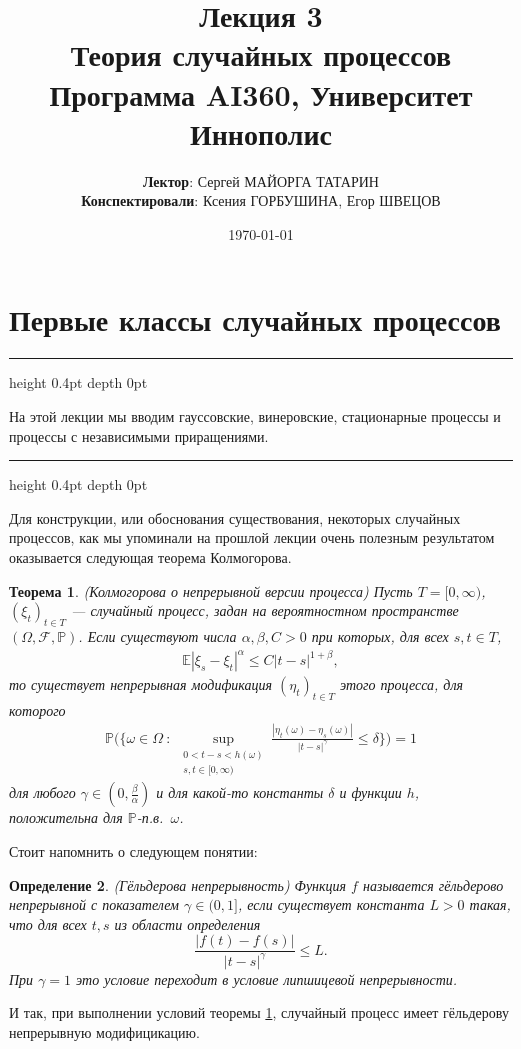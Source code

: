 \documentclass[10pt]{article}
\author{\textbf{Лектор}: Сергей МАЙОРГА ТАТАРИН \\ \textbf{Конспектировали}: Ксения ГОРБУШИНА, Егор ШВЕЦОВ}
\date{\today}
\title{Лекция 3 \\ Теория случайных процессов \\ Программа AI360, Университет Иннополис}
\newtheorem{thm}{Теорема}[section]
\newtheorem{defn}[thm]{Определение}
\theoremstyle{boldnormal}
\newcommand{\PP}{{\ensuremath{\mathbb{P}}}}
\newcommand{\EE}{{\ensuremath{\mathbb{E}}}}
\theoremstyle{boldremark}
\newenvironment{sectionabstract}{%
  \par\vspace{3pt}%
  \hrule height 0.4pt depth 0pt \relax
  \vspace{3pt}%
  \itshape\small
  \list{}{%
    \leftmargin=2em
    \rightmargin=2em
    \topsep=0pt
    \parsep=0pt
  }%
  \item\relax
}{%
  \endlist
  \par\vspace{3pt}%
  \hrule height 0.4pt depth 0pt \relax
  \vspace{3pt}%
}
\begin{document}
\maketitle

\section{Первые классы случайных процессов}
\begin{sectionabstract}
    На этой лекции мы вводим 
гауссовские, винеровские, стационарные процессы и процессы 
с независимыми приращениями.
\end{sectionabstract}

Для конструкции, или обоснования существования,
некоторых случайных процессов, как мы упоминали на прошлой 
лекции очень полезным результатом оказывается следующая 
теорема Колмогорова.
\begin{thm}\label{thm:kolmogorovcontver} (Колмогорова о непрерывной 
  версии процесса)
Пусть \(T=[0,\infty)\), \((\xi_t)_{t\in T}\) --- случайный процесс,
задан на вероятностном пространстве \((\Omega,\mathscr{F},\PP)\). Если
существуют числа \(\alpha,\beta,C>0\) при которых, для 
всех \(s,t\in T\), 
\begin{align*}
  \EE|\xi_s-\xi_t|^{\alpha} \leq C |t-s|^{1+\beta},
\end{align*}
то существует непрерывная модификация \((\eta_t)_{t\in T}\) 
этого процесса, для которого 
\begin{align*}
  \PP\big( \big\{ \omega \in \Omega \ : \
  \sup_{\substack{ 0<t-s<h(\omega)\\ s,t\in [0,\infty) }}
  \frac{|\eta_t(\omega)-\eta_s(\omega)|}{|t-s|^{\gamma}} 
  \leq \delta
  \big\}  \big) = 1
\end{align*}
для любого \(\gamma\in (0,\frac{\beta}{\alpha})\) и 
для какой-то константы \(\delta\) и функции \(h\),
положительна для \(\mathbb{P}\)-п.в.~\(\omega\).
\end{thm}

Стоит напомнить о следующем понятии:
\begin{defn}
(Гёльдерова непрерывность)
Функция $f$ называется \emph{гёльдерово непрерывной}
с показателем $\gamma\in(0,1]$, если существует константа $L>0$
такая, что для всех $t,s$ из области определения
\[
\frac{|f(t)-f(s)|}{|t-s|^\gamma}\le L.
\]
При $\gamma=1$ это условие переходит в условие липшицевой непрерывности.
\end{defn}
И так, при выполнении условий теоремы \ref{thm:kolmogorovcontver},
случайный процесс имеет гёльдерову непрерывную модифицикацию.
\end{document}
